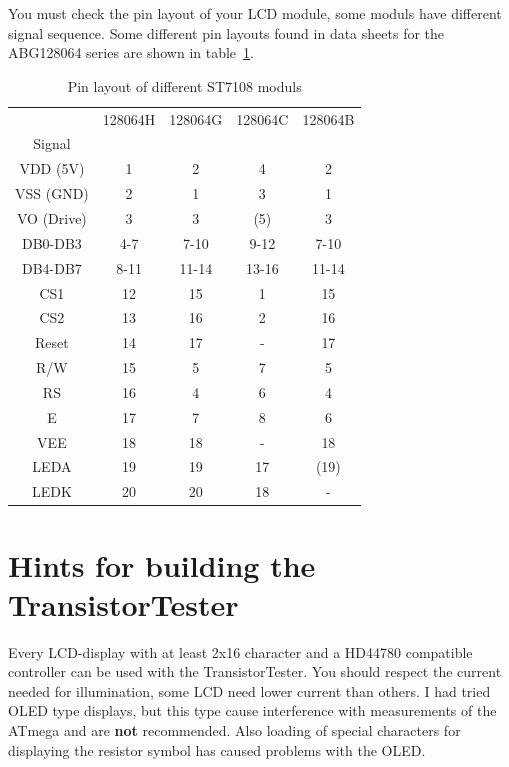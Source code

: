 You must check the pin layout of your LCD module, some moduls have different signal sequence.
Some different pin layouts found in data sheets for the ABG128064 series are shown in table~\ref{tab:ST7108types}.

\begin{table}[H]
  \begin{center}
    \begin{tabular}{| c || c | c | c | c |}
    \hline
           & 128064H  &  128064G  & 128064C  & 128064B \\
    Signal &         &          &         &         \\
    \hline
    \hline
  VDD (5V) &   1     &  2       &   4     & 2       \\
    \hline
  VSS (GND) &   2     &  1       &   3     & 1       \\
    \hline
 VO (Drive) &   3     &  3       &  (5)    & 3       \\
    \hline
  DB0-DB3   &   4-7   &  7-10    &   9-12  & 7-10    \\
    \hline
  DB4-DB7   &   8-11  &  11-14   &   13-16 & 11-14   \\
    \hline
  CS1       &   12    &  15      &   1     & 15      \\
  CS2       &   13    &  16      &   2     & 16      \\
    \hline
  Reset     &   14    &  17      &   -     & 17      \\
    \hline
  R/W       &   15    &  5       &   7     & 5       \\
    \hline
  RS        &   16    &  4       &   6     & 4       \\
    \hline
  E         &   17    &  7       &   8     & 6       \\
    \hline
  VEE       &   18    &  18      &   -     & 18      \\
    \hline
  LEDA      &   19    &  19      &   17    & (19)      \\
  LEDK      &   20    &  20      &   18    & -      \\
    \hline
    \end{tabular}
  \end{center}
  \caption{Pin layout of different ST7108 moduls}
  \label{tab:ST7108types}
\end{table}


\section{Hints for building the TransistorTester}
Every LCD-display with at least 2x16 character and a HD44780 compatible controller
can be used with the TransistorTester. You should respect the current needed for
illumination, some LCD need lower current than others.
I had tried OLED type displays, but this type cause interference with measurements
of the ATmega and are {\bf not} recommended. Also loading of special characters
for displaying the resistor symbol has caused problems with the OLED.


